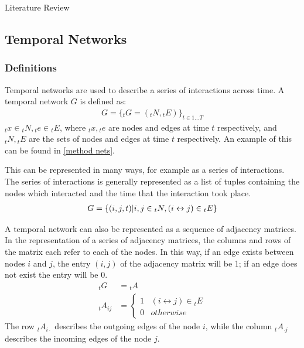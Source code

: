 \documentclass[12pt]{amsart}
\begin{document}
\begin{section}{Literature Review}

    \subsection{Temporal Networks}
        \subsubsection{Definitions}
        Temporal networks are used to describe a series of interactions across time.
        A temporal network $G$ is defined as:  
        \begin{align}
            G=\{ {_t} G=({_t} N, {_t} E)\} _{t \in 1\ldots T } 
        \end{align}
        $_t x \in {_t} N, {_t} e\in {_t} E$, where ${_t} x, {_t} e$ are nodes and edges at time $t$ respectively, and ${_t} N, {_t} E$ are the sets of nodes and edges at time $t$ respectively.
        An example of this can be found in \autoref{method nets}.
        
        This can be represented in many ways, for example as a series of interactions. The series of interactions is generally represented as a list of tuples containing the nodes which interacted and the time that the interaction took place. 
        \begin{align}
            G=\{(i, j, t)|\space i,j\in {_t} N, (i\leftrightarrow j)\in {_t}E \}
        \end{align}
        
        A temporal network can also be represented as a sequence of adjacency matrices. In the representation of a series of adjacency matrices, the columns and rows of the matrix each refer to each of the nodes. In this way, if an edge exists between nodes $i$ and $j$, the entry $(i,j)$ of the adjacency matrix will be 1; if an edge does not exist the entry will be 0.
        \begin{align}
            _t G &= {_t} A\\
            _t A_{ij} &=  
            \left\{
                \begin{array}{ll} 
                1 & (i\leftrightarrow j)\in {_t} E\\
                0 & otherwise
                \end{array}
            \right.
        \end{align}
        The row $_t A_{i\cdot}$ describes the outgoing edges of the node $i$, while the column $_t A_{\cdot j}$ describes the incoming edges of the node $j$.


\end{section}
\end{document}
